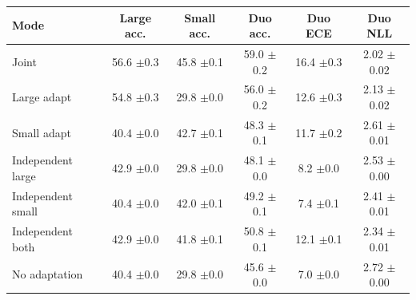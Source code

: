 \begin{table}[t]
\begin{tabular}{lccccc}
        \toprule
        Mode & Large acc. & Small acc. & Duo acc. & Duo ECE & Duo NLL \\
        \midrule
        Joint & 56.6 {\scriptsize$\pm$0.3} & 45.8 {\scriptsize$\pm$0.1} & 59.0 {\scriptsize$\pm$0.2} & 16.4 {\scriptsize$\pm$0.3} & 2.02 {\scriptsize$\pm$0.02} \\
        Large adapt & 54.8 {\scriptsize$\pm$0.3} & 29.8 {\scriptsize$\pm$0.0} & 56.0 {\scriptsize$\pm$0.2} & 12.6 {\scriptsize$\pm$0.3} & 2.13 {\scriptsize$\pm$0.02} \\
        Small adapt & 40.4 {\scriptsize$\pm$0.0} & 42.7 {\scriptsize$\pm$0.1} & 48.3 {\scriptsize$\pm$0.1} & 11.7 {\scriptsize$\pm$0.2} & 2.61 {\scriptsize$\pm$0.01} \\
        \midrule
        Independent large & 42.9 {\scriptsize$\pm$0.0} & 29.8 {\scriptsize$\pm$0.0} & 48.1 {\scriptsize$\pm$0.0} & 8.2 {\scriptsize$\pm$0.0} & 2.53 {\scriptsize$\pm$0.00} \\
        Independent small & 40.4 {\scriptsize$\pm$0.0} & 42.0 {\scriptsize$\pm$0.1} & 49.2 {\scriptsize$\pm$0.1} & 7.4 {\scriptsize$\pm$0.1} & 2.41 {\scriptsize$\pm$0.01} \\
        Independent both & 42.9 {\scriptsize$\pm$0.0} & 41.8 {\scriptsize$\pm$0.1} & 50.8 {\scriptsize$\pm$0.1} & 12.1 {\scriptsize$\pm$0.1} & 2.34 {\scriptsize$\pm$0.01} \\
        \midrule
        No adaptation & 40.4 {\scriptsize$\pm$0.0} & 29.8 {\scriptsize$\pm$0.0} & 45.6 {\scriptsize$\pm$0.0} & 7.0 {\scriptsize$\pm$0.0} & 2.72 {\scriptsize$\pm$0.00} \\
        \bottomrule
    \end{tabular}
\end{table}
